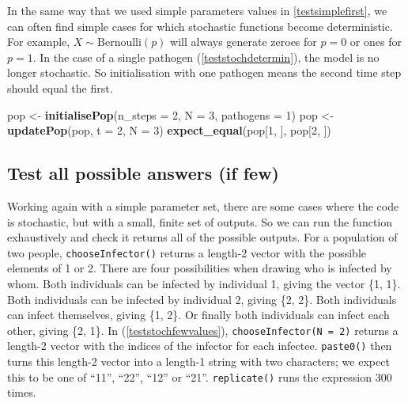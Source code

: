 \documentclass[
]{article}
\newenvironment{Shaded}{\begin{snugshade}}{\end{snugshade}}
\newcommand{\DataTypeTok}[1]{\textcolor[rgb]{0.13,0.29,0.53}{#1}}
\newcommand{\DecValTok}[1]{\textcolor[rgb]{0.00,0.00,0.81}{#1}}
\newcommand{\KeywordTok}[1]{\textcolor[rgb]{0.13,0.29,0.53}{\textbf{#1}}}
\newcommand{\NormalTok}[1]{#1}
\newcommand{\StringTok}[1]{\textcolor[rgb]{0.31,0.60,0.02}{#1}}
\begin{document}
In the same way that we used simple parameters values in \ref{testsimplefirst}, we can often find simple cases for which stochastic functions become deterministic.
For example, \(X\sim\text{Bernoulli}(p)\) will always generate zeroes for \(p=0\) or ones for \(p=1\).
In the case of a single pathogen (\ref{teststochdetermin}), the model is no longer stochastic.
So initialisation with one pathogen means the second time step should equal the first.
\newline
{}\label{teststochdetermin}

\begin{Shaded}
\begin{Highlighting}[]
\NormalTok{pop <-}\StringTok{ }\KeywordTok{initialisePop}\NormalTok{(}\DataTypeTok{n_steps =} \DecValTok{2}\NormalTok{, }\DataTypeTok{N =} \DecValTok{3}\NormalTok{, }\DataTypeTok{pathogens =} \DecValTok{1}\NormalTok{) }
\NormalTok{pop <-}\StringTok{ }\KeywordTok{updatePop}\NormalTok{(pop, }\DataTypeTok{t =} \DecValTok{2}\NormalTok{, }\DataTypeTok{N =} \DecValTok{3}\NormalTok{)}
\KeywordTok{expect_equal}\NormalTok{(pop[}\DecValTok{1}\NormalTok{, ], pop[}\DecValTok{2}\NormalTok{, ])}
\end{Highlighting}
\end{Shaded}

\hypertarget{allpossible}{%
\subsection*{Test all possible answers (if few)}\label{allpossible}}

Working again with a simple parameter set, there are some cases where the code is stochastic, but with a small, finite set of outputs.
So we can run the function exhaustively and check it returns all of the possible outputs.
For a population of two people, \texttt{chooseInfector()} returns a length-2 vector with the possible elements of 1 or 2.
There are four possibilities when drawing who is infected by whom.
Both individuals can be infected by individual 1, giving the vector \{1, 1\}.
Both individuals can be infected by individual 2, giving \{2, 2\}.
Both individuals can infect themselves, giving \{1, 2\}.
Or finally both individuals can infect each other, giving \{2, 1\}.
In (\ref{teststochfewvalues}), \texttt{chooseInfector(N\ =\ 2)} returns a length-2 vector with the indices of the infector for each infectee.
\texttt{paste0()} then turns this length-2 vector into a length-1 string with two characters; we expect this to be one of ``11'', ``22'', ``12'' or ``21''.
\texttt{replicate()} runs the expression 300 times.
\newline
{}\label{teststochfewvalues}
\end{document}
